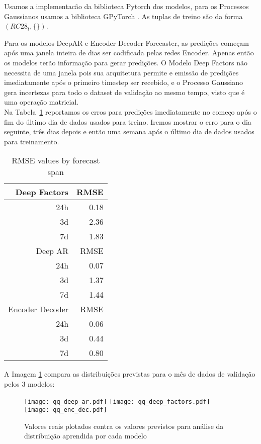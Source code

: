 Usamos a implementacão da biblioteca Pytorch \cite{pytorch} dos modelos, para os Processos Gaussianos usamos a biblioteca GPyTorch \cite{gpytorch}. As tuplas de treino são da forma $(RC28_{t},\{\})$. 

Para os modelos DeepAR e Encoder-Decoder-Forecaster, as predições começam após
uma janela inteira de dias ser codificada pelas redes Encoder.
Apenas então os modelos terão informação para gerar predições. O Modelo Deep
Factors não necessita de uma janela pois sua arquitetura permite e emissão de
predições imediatamente após o primeiro timestep ser recebido,
e o Processo Gaussiano gera incertezas para todo o dataset de validação ao mesmo tempo, visto que é uma operação matricial. \\

Na Tabela~\ref{tb:rmse} reportamos os erros para predições imediatamente no
começo após o fim do último dia de dados usados para treino. Iremos mostrar o
erro para o dia seguinte, três dias depois e então uma semana após o último dia
de dados usados para treinamento.

\begin{center}
\begin{table}[htbp]
\caption{RMSE values by forecast span}
\centering
\begin{tabular}{rr}
\hline
Deep Factors & RMSE\\
\hline
24h & 0.18\\
3d & 2.36\\
7d & 1.83\\
\hline
Deep AR & RMSE\\
\hline
  24h & 0.07\\
3d & 1.37\\
7d & 1.44\\
\hline
Encoder Decoder & RMSE\\
\hline
24h & 0.06\\
3d & 0.44\\
7d & 0.80\\
\end{tabular}

\label{tb:rmse}
\end{table}
\end{center}

A Imagem \ref{fig:distr} compara as distribuições previstas para o mês
de dados de validação pelos 3 modelos:

\begin{figure}[H]
\centering
\texttt{[image: qq\_deep\_ar.pdf]} \hfill
\texttt{[image: qq\_deep\_factors.pdf]} \hfill
\texttt{[image: qq\_enc\_dec.pdf]} 
\caption{Valores reais plotados contra os valores previstos para análise da distribuição aprendida por cada modelo} 
\label{fig:distr}
\end{figure}


